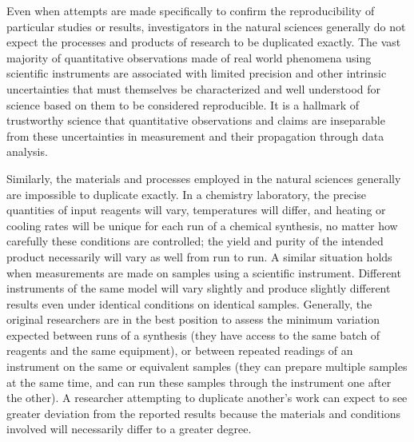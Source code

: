 Even when attempts are made specifically to confirm the reproducibility of particular studies or results, investigators in
	the natural sciences generally do not expect the processes and products of research to be duplicated exactly.
The vast majority of quantitative observations made of real world phenomena using scientific instruments
	are associated with limited precision and other intrinsic uncertainties that must themselves be characterized
	and well understood for science based on them to be considered reproducible.
It is a hallmark of trustworthy science that quantitative observations and claims are inseparable from these
	uncertainties in measurement and their propagation through data analysis.

Similarly, the materials and processes employed in the natural sciences generally are impossible
	to duplicate exactly.
In a chemistry laboratory, the precise quantities of input reagents will vary, temperatures will differ, and heating
	or cooling rates will be unique for each run of a chemical synthesis, no matter how carefully these conditions
	are controlled; the yield and purity of the intended product necessarily will vary as well from run to run.
A similar situation holds when measurements are made on samples using a scientific instrument.
Different instruments of the same model will vary slightly and produce slightly different results even
	under identical conditions on identical samples.
Generally, the original researchers are in the best position to assess the minimum variation expected
	between runs of a synthesis (they have access to the same batch of reagents and the same equipment),
	or between repeated readings of an instrument on the same or equivalent samples (they can prepare
	multiple samples at the same time, and can run these samples through the instrument one after the other).
A researcher attempting to duplicate another's work can expect to see greater deviation from the reported results
	because the materials and conditions involved will necessarily differ to a greater degree.

